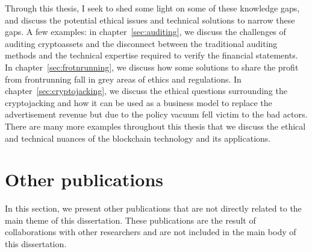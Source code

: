 Through this thesis, I seek to shed some light on some of these knowledge gaps, and discuss the potential ethical issues and technical solutions to narrow these gaps. A few examples: in chapter~\ref{sec:auditing}, we discuss the challenges of auditing cryptoassets and the disconnect between the traditional auditing methods and the technical expertise required to verify the financial statements. In chapter~\ref{sec:frotnrunning}, we discuss how some solutions to share the profit from frontrunning fall in grey areas of ethics and regulations. In chapter~\ref{sec:cryptojacking}, we discuss the ethical questions surrounding the cryptojacking and how it can be used as a business model to replace the advertisement revenue but due to the policy vacuum fell victim to the bad actors. There are many more examples throughout this thesis that we discuss the ethical and technical nuances of the blockchain technology and its applications.



\section{Other publications}
In this section, we present other publications that are not directly related to the main theme of this dissertation. These publications are the result of collaborations with other researchers and are not included in the main body of this dissertation.


